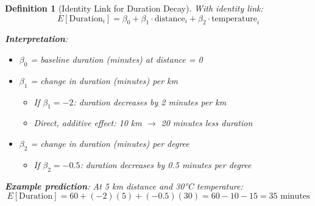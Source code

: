 \documentclass{article}
\newtheorem{definition}{Definition}
\begin{document}
\begin{definition}[Identity Link for Duration Decay]
With identity link:
\begin{equation}
E[\text{Duration}_i] = \beta_0 + \beta_1 \cdot \text{distance}_i + \beta_2 \cdot \text{temperature}_i
\end{equation}

\textbf{Interpretation}:
\begin{itemize}
    \item $\beta_0$ = baseline duration (minutes) at distance = 0
    \item $\beta_1$ = change in duration (minutes) per km
        \begin{itemize}
            \item If $\beta_1 = -2$: duration decreases by 2 minutes per km
            \item Direct, additive effect: 10 km $\rightarrow$ 20 minutes less duration
        \end{itemize}
    \item $\beta_2$ = change in duration (minutes) per degree
        \begin{itemize}
            \item If $\beta_2 = -0.5$: duration decreases by 0.5 minutes per degree
        \end{itemize}
\end{itemize}

\textbf{Example prediction}:
At 5 km distance and 30°C temperature:
\begin{equation}
E[\text{Duration}] = 60 + (-2)(5) + (-0.5)(30) = 60 - 10 - 15 = 35 \text{ minutes}
\end{equation}
\end{definition}
\end{document}
